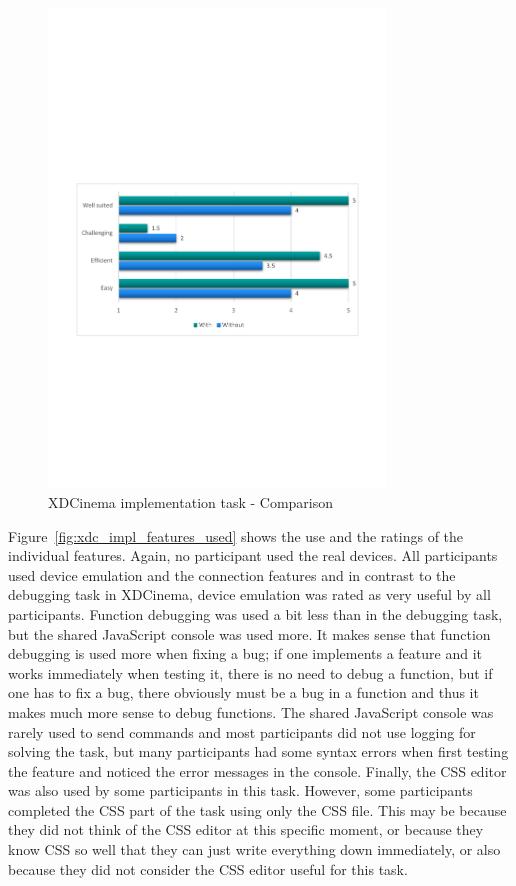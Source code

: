 \begin{figure}[h!]
  \centering
    \includegraphics[trim={0 0 0.1cm 0},clip,width=0.8\textwidth]{images/charts/xdc_impl_comparison.pdf}
	\caption[xdc-impl: Comparison]{XDCinema implementation task - Comparison}
	\label{fig:xdc_impl_comparison}
\end{figure}

Figure~\ref{fig:xdc_impl_features_used} shows the use and the ratings of the individual features. Again, no participant used the real devices. All participants used device emulation and the connection features and in contrast to the debugging task in XDCinema, device emulation was rated as very useful by all participants. Function debugging was used a bit less than in the debugging task, but the shared JavaScript console was used more. It makes sense that function debugging is used more when fixing a bug; if one implements a feature and it works immediately when testing it, there is no need to debug a function, but if one has to fix a bug, there obviously must be a bug in a function and thus it makes much more sense to debug functions. The shared JavaScript console was rarely used to send commands and most participants did not use logging for solving the task, but many participants had some syntax errors when first testing the feature and noticed the error messages in the console. Finally, the CSS editor was also used by some participants in this task. However, some participants completed the CSS part of the task using only the CSS file. This may be because they did not think of the CSS editor at this specific moment, or because they know CSS so well that they can just write everything down immediately, or also because they did not consider the CSS editor useful for this task.

